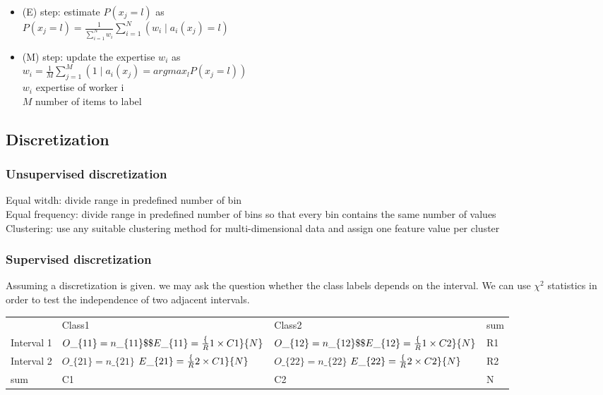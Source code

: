 \begin{itemize}
\item (E) step: estimate $ P(x_j = l ) $ as \\
  $ P(x_j = l) = \frac{1}{\sum_{i = 1}^N w_i} \sum_{i = 1}^N (w_i \mid
  a_i(x_j) = l) $
\item (M) step: update the expertise $ w_i $ as \\
  $ w_i = \frac{1}{M} \sum_{j = 1}^M (1 \mid a_i(x_j) = argmax_l P
  (x_j = l)) $ \\
  $ w_i $ expertise of worker i \\
  $ M $ number of items to label
\end{itemize}

\subsection{Discretization}

\subsubsection{Unsupervised discretization}
Equal witdh: divide range in predefined number of bin \\
Equal frequency: divide range in predefined number of bins so that
every bin contains the same number of values \\
Clustering: use any suitable clustering method for multi-dimensional
data and assign one feature value per cluster

\subsubsection{Supervised discretization}

Assuming a discretization is given. we may ask the question whether
the class labels depends on the interval. We can use $ \chi^2 $
statistics in order to test the independence of two adjacent
intervals.

\begin{table}[!htbp]
  \begin{tabular}{l|l|l|l}
    ~ & Class1 & Class2 & sum \\
    Interval 1 & $ O\_\{11\} = n\_\{11\} \$ \$ E\_\{11\} =\frac\{R1
                 \times C1\}\{N\} $  & $ O\_\{12\} = n\_\{12\} \$ \$
                                       E\_\{12\} = \frac\{R1 \times
                                       C2\}\{N\} $ & R1  \\ \hline

    Interval 2 & $ O\_\{21\} = n\_\{21\} $ $ E\_\{21\} = \frac\{R2
                 \times C1\}\{N\} $ & $ O\_\{22\} = n\_\{22\} $ $
                                      E\_\{22\} = \frac\{R2 \times
                                      C2\}\{N\} $ & R2 \\ \hline
    sum & C1 & C2 & N \\
  \end{tabular}
\end{table}

